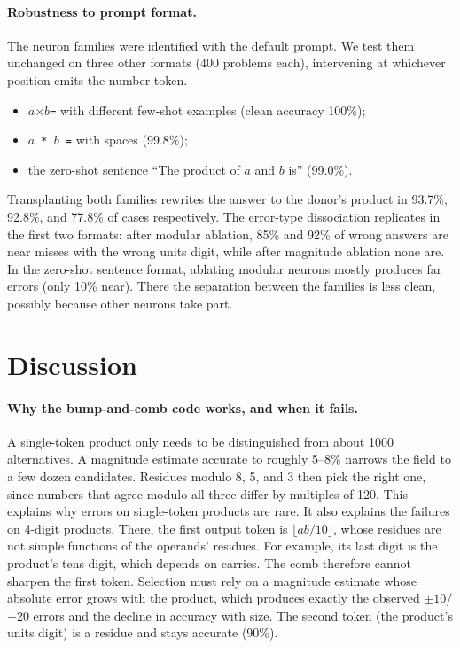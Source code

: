 \documentclass[11pt]{article}
\begin{document}
\paragraph{Robustness to prompt format.} The neuron families were identified with the default prompt. We test them unchanged on three other formats (400 problems each), intervening at whichever position emits the number token.
\begin{itemize}[leftmargin=1.2em,itemsep=1pt]
  \item \texttt{$a$$\times$$b$=} with different few-shot examples (clean accuracy 100\%);
  \item \texttt{$a$ * $b$ =} with spaces (99.8\%);
  \item the zero-shot sentence ``The product of $a$ and $b$ is'' (99.0\%).
\end{itemize}
Transplanting both families rewrites the answer to the donor's product in 93.7\%, 92.8\%, and 77.8\% of cases respectively. The error-type dissociation replicates in the first two formats: after modular ablation, 85\% and 92\% of wrong answers are near misses with the wrong units digit, while after magnitude ablation none are. In the zero-shot sentence format, ablating modular neurons mostly produces far errors (only 10\% near). There the separation between the families is less clean, possibly because other neurons take part.

\section{Discussion}
\label{sec:discussion}
\paragraph{Why the bump-and-comb code works, and when it fails.} A single-token product only needs to be distinguished from about 1000 alternatives. A magnitude estimate accurate to roughly 5--8\% narrows the field to a few dozen candidates. Residues modulo 8, 5, and 3 then pick the right one, since numbers that agree modulo all three differ by multiples of 120. This explains why errors on single-token products are rare. It also explains the failures on 4-digit products. There, the first output token is $\lfloor ab/10\rfloor$, whose residues are not simple functions of the operands' residues. For example, its last digit is the product's tens digit, which depends on carries. The comb therefore cannot sharpen the first token. Selection must rely on a magnitude estimate whose absolute error grows with the product, which produces exactly the observed $\pm10$/$\pm20$ errors and the decline in accuracy with size. The second token (the product's units digit) is a residue and stays accurate (90\%).
\end{document}
